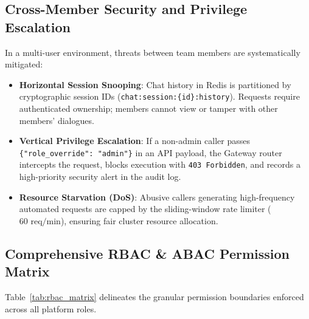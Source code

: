 \documentclass[11pt,a4paper]{article}
\begin{document}
\subsection{Cross-Member Security and Privilege Escalation}
In a multi-user environment, threats between team members are systematically mitigated:
\begin{itemize}[leftmargin=*]
    \item \textbf{Horizontal Session Snooping}: Chat history in Redis is partitioned by cryptographic session IDs (\texttt{chat:session:\{id\}:history}). Requests require authenticated ownership; members cannot view or tamper with other members' dialogues.
    \item \textbf{Vertical Privilege Escalation}: If a non-admin caller passes \texttt{\{"role\_override": "admin"\}} in an API payload, the Gateway router intercepts the request, blocks execution with \texttt{403 Forbidden}, and records a high-priority security alert in the audit log.
    \item \textbf{Resource Starvation (DoS)}: Abusive callers generating high-frequency automated requests are capped by the sliding-window rate limiter ($60\text{ req/min}$), ensuring fair cluster resource allocation.
\end{itemize}

\subsection{Comprehensive RBAC \& ABAC Permission Matrix}
Table~\ref{tab:rbac_matrix} delineates the granular permission boundaries enforced across all platform roles.
\end{document}
